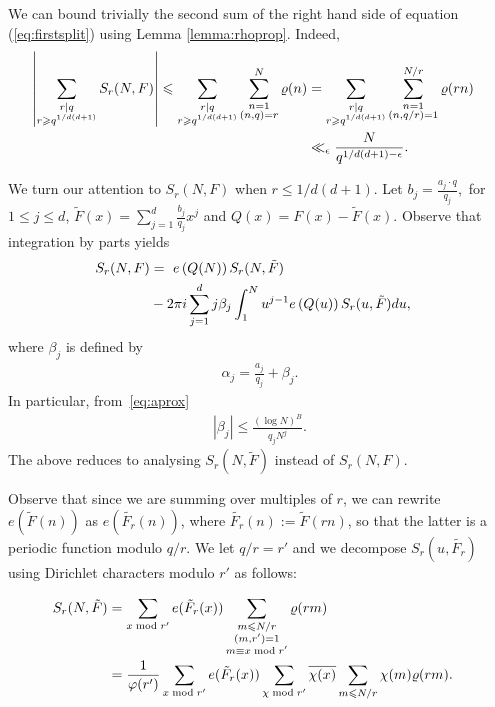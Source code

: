\documentclass[12pt]{amsart}
\def\\{\cr}
\def\le{\leqslant}
\def\ge{\geqslant}
\begin{document}
 
 We can bound trivially the second sum of the right hand side of equation (\ref{eq:firstsplit}) using Lemma \ref{lemma:rhoprop}.  Indeed,
\begin{align}
 \label{eq:rbig}
\nonumber \left| \sum_{\substack{ r|q \\ r \ge q^{1/d(d+1)}}} S_r(N,F) \right|  \le  \sum_{\substack{ r|q \\ r \ge q^{1/d(d+1)}}} \sum_{\substack{n=1 \\ (n,q)=r}}^N \varrho(n)&  =  \sum_{\substack{ r|q \\ r \ge q^{1/d(d+1)}}} \sum_{\substack{n=1 \\ (n,q/r)=1}}^{N/r} \varrho(rn)\\
 & \ll_{\epsilon}  \frac{N}{q^{1/d(d+1) -\epsilon}}.
 \end{align}
 
We turn our attention to $S_r(N,F)$ when $r\le 1/d(d+1)$.  Let  $b_j = \frac{a_j\cdot q}{q_j},$ for $1\le j \le d$, $\tilde{F}(x) = \sum_{j=1}^d \frac{b_j}{q_j}x^j$ and $Q(x) = F(x) - \tilde{F}(x)$. Observe that integration by parts yields 
\begin{align}
\label{eq:mainterm}
\begin{split}
S_r(N, F) &= \ e\left(  Q(N) \right)  S_r(N, \tilde{F}) \\&-  2\pi i \sum_{j=1}^d j\beta_j  \int_{1}^N u^{j-1} e\left( Q(u) \right) S_r(u, \tilde{F})du,
\end{split}
\end{align}
where $\beta_j$ is defined by 
\begin{align}
\label{eq:betajdef}
\alpha_j=\frac{a_j}{q_j}+\beta_j.
\end{align}
In particular, from~\eqref{eq:aprox}
\begin{align}
\label{eq:betabound1}
|\beta_j|\le \frac{ (\log{N})^B}{q_jN^j}.
\end{align}
The above reduces to analysing $S_r(N, \tilde{F})$ instead of $S_r(N, F)$.



Observe that since we are summing over multiples of $r$, we can rewrite $e(\tilde{F}(n))$ as $e(\tilde{F_r}(n))$, where $\tilde{F_r}(n):=\tilde{F}(rn)$, so that the latter  is a periodic function modulo $q/r$. We let $q/r=r'$ and we decompose $S_r (u, \tilde{F_r})$ using Dirichlet characters modulo $r'$ as follows:

\begin{equation}
\begin{split}
S_r(N, \tilde{F})& = \sum_{x\bmod{r'}} e(\tilde{F}_r(x)) \sum_{ \substack{ m \le N/r \\ (m,r')=1 \\ m\equiv x\bmod{r'} }} \varrho(rm) \\
& = \frac1{\varphi(r')}\sum_{x\bmod{r'}} e(\tilde{F}_r(x))  \sum_{ \chi \bmod{r'}} \overline{\chi(x)} \sum_{m\le N/r} \chi(m) \varrho(rm).
 \end{split}
\end{equation}
\end{document}
